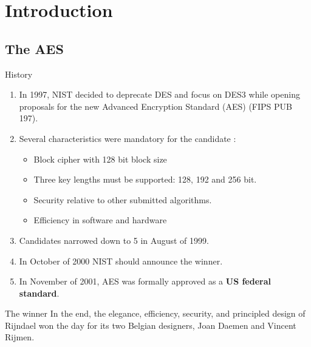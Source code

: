 

\section{Introduction}

\subsection{The AES}

\begin{frame}[t]{History}
	\begin{enumerate}
		\item In 1997, NIST decided to deprecate DES and focus on DES3 while opening proposals for the new Advanced Encryption Standard (AES) (FIPS PUB 197).
		\item Several characteristics were mandatory for the candidate \cite{Paar2010understanding}:
			\begin{itemize}
				\item Block cipher with 128 bit block size
				\item Three key lengths must be supported: 128, 192 and 256 bit.
				\item Security relative to other submitted algorithms.
				\item Efficiency in software and hardware
			\end{itemize}
		\item Candidates narrowed down to 5 in August of 1999.
		\item In October of 2000 NIST should announce the winner.
		\item In November of 2001, AES was formally approved as a \textbf{US federal standard}.
	\end{enumerate}
\end{frame}

\begin{frame}[t]{The winner}
	In the end, the elegance, efficiency, security, and principled design of Rijndael won the day for its two Belgian designers, Joan Daemen and Vincent Rijmen.
\end{frame}





